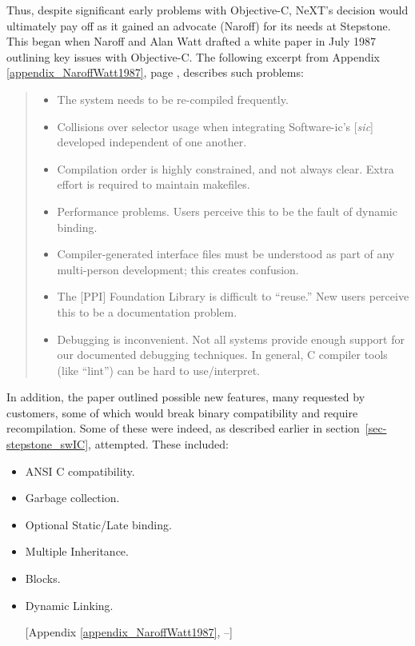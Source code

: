 \documentclass[acmsmall,screen]{acmart}
\begin{document}
Thus, despite significant early problems with Objective-C, NeXT's decision would ultimately pay off as it gained an advocate (Naroff) for its needs at Stepstone. This began when Naroff and Alan Watt drafted a white paper in July 1987 outlining key issues with Objective-C. The following excerpt %
from Appendix \ref{appendix_NaroffWatt1987}, page , describes such problems:
\begin{quotation}
\begin{itemize}
\item The system needs to be re-compiled frequently.
\item Collisions over selector usage when integrating Software-ic's [\emph{sic}] developed independent of one another.
\item Compilation order is highly constrained, and not always clear. Extra effort is required to maintain makefiles.
\item Performance problems. Users perceive this to be the fault of dynamic binding.
\item Compiler-generated interface files must be understood as part of any multi-person development; this creates confusion.
\item The [PPI] Foundation Library is difficult to ``reuse.'' New users perceive this to be a documentation problem.
\item Debugging is inconvenient. Not all systems provide enough support for our documented debugging techniques. In general, C compiler tools (like ``lint'') can be hard to use/interpret.
\end{itemize}
\end{quotation}
In addition, the paper outlined possible new features, many requested by customers, some of which would break binary compatibility and require recompilation. Some of these were indeed, as described earlier in section~\ref{sec-stepstone_swIC}, attempted. These included:
\begin{itemize}
\item ANSI C compatibility.
\item Garbage collection.
\item Optional Static/Late binding.
\item Multiple Inheritance.
\item Blocks.
\item Dynamic Linking. 
\addtocounter{appendixpagenumrangestart}{3}
\addtocounter{appendixpagenumrangeend}{7}
[Appendix  \ref{appendix_NaroffWatt1987},  --]
\end{itemize}
\end{document}
